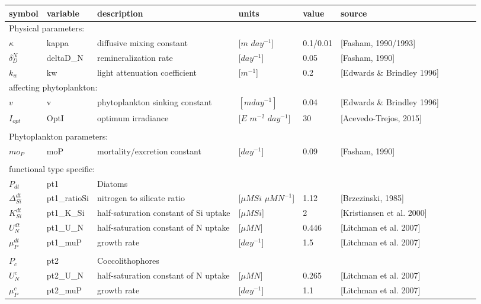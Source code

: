 \documentclass[11pt,letterpaper,english]{article}
\begin{document}
\noindent
\begin{tabular}{llllllllll}

  symbol               & variable   & description & units   & value      & source\\
  \hline
  \multicolumn{3}{l}{Physical parameters:}\\
  \hline
  $\kappa$ & kappa & diffusive mixing constant & [$m$ $day^{-1}$] & 0.1/0.01 & [Fasham, 1990/1993]\\
  $\delta^{N}_{D}$ & deltaD\_N  & remineralization rate & [$day^{-1}$] & 0.05 & [Fasham, 1990]\\
  $k_w$ & kw & light attenuation coefficient & [$m^{-1}$] & 0.2 & [Edwards \& Brindley 1996]\\                           
  \multicolumn{3}{l}{affecting phytoplankton:} \\
  $v$ & v &  phytoplankton sinking constant & $[m day^{-1}]$ & 0.04 & [Edwards \& Brindley 1996]\\                      
  $I_{opt}$ & OptI & optimum irradiance & [$E$ $m^{-2}$ $day^{-1}$] & 30 & [Acevedo-Trejos, 2015]\\
  \\
  \hline
  \multicolumn{3}{l}{Phytoplankton parameters:}\\
  \hline
  $mo_P$ & moP &  mortality/excretion constant & [$day^{-1}$] & 0.09 & [Fasham, 1990]\\
  \\
  \multicolumn{3}{l}{functional type specific:} \\
  $P_{dt}$ & pt1  & Diatoms\\
  \hline
  $\Delta^{dt}_{Si}$ & pt1\_ratioSi & nitrogen to silicate ratio & [$\mu M Si$ $\mu M N^{-1}$] & 1.12 & [Brzezinski, 1985]  \\
  $K^{dt}_{Si}$ & pt1\_K\_Si & half-saturation constant of Si uptake & [$\mu M Si$] & 2 & [Kristiansen et al. 2000]\\
  $U^{dt}_N$ & pt1\_U\_N & half-saturation constant of N uptake & [$\mu M N$] &  0.446 & [Litchman et al. 2007]\\
  $\mu^{dt}_P$ & pt1\_muP & growth rate & [$day^{-1}$] & 1.5 & [Litchman et al. 2007]\\
  \\
  $P_{c}$ & pt2 & Coccolithophores\\
  \hline
  $U^{c}_N$ & pt2\_U\_N & half-saturation constant of N uptake & [$\mu M N$]  &  0.265 & [Litchman et al. 2007]\\
  $\mu^{c}_P$ & pt2\_muP  & growth rate & [$day^{-1}$]& 1.1 & [Litchman et al. 2007] \\

\end{tabular}
\end{document}

